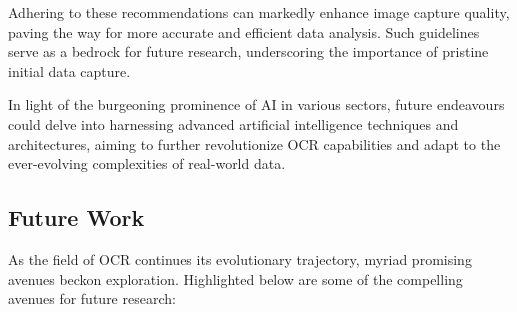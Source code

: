 Adhering to these recommendations can markedly enhance image capture quality, paving the way for more accurate and efficient data analysis. Such guidelines serve as a bedrock for future research, underscoring the importance of pristine initial data capture.

In light of the burgeoning prominence of AI in various sectors, future endeavours could delve into harnessing advanced artificial intelligence techniques and architectures, aiming to further revolutionize OCR capabilities and adapt to the ever-evolving complexities of real-world data.


\subsection{Future Work}

As the field of OCR continues its evolutionary trajectory, myriad promising avenues beckon exploration. Highlighted below are some of the compelling avenues for future research:

